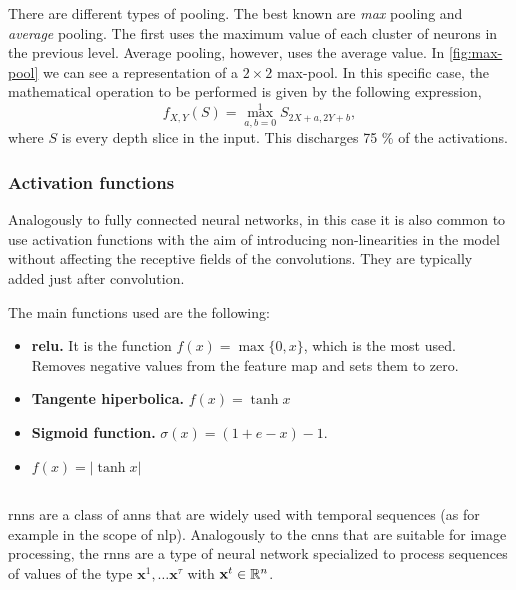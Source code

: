 There are different types of pooling. The best known are \emph{max} pooling and
\emph{average} pooling. The first uses the maximum value of each cluster of
neurons in the previous level. Average pooling, however, uses the average
value. In \vref{fig:max-pool} we can see a representation of a \(2 \times 2\)
max-pool. In this specific case, the mathematical operation to be performed is
given by the following expression,
\begin{equation}
  f_{X,Y}(S) = \max _{a,b=0}^{1}S_{2X+a,2Y+b},
\end{equation}
where \(S\) is every depth slice in the input. This discharges 75 \% of the
activations.

\subsubsection{Activation functions}

Analogously to fully connected neural networks, in this case it is also common
to use activation functions with the aim of introducing non-linearities in the
model without affecting the receptive fields of the convolutions. They are
typically added just after convolution.

The main functions used are the following:
\begin{itemize}
  \item \textbf{\gls*{relu}.} It is the function \(f (x) = \max \{0, x\}\),
  which is the most used. Removes negative values from the feature map and sets
  them to zero.
  \item \textbf{Tangente hiperbolica.} \(f (x) = \tanh x\)
  \item \textbf{Sigmoid function.} \(\sigma (x) ={(1 + e - x)} -1\).
  \item \(f (x) = | \tanh x |\)
\end{itemize}


\subsection{}\label{sec:rnn}

\glspl{rnn} are a class of \glspl{ann} that are widely used with temporal
sequences (as for example in the scope of \gls{nlp}). Analogously to the
\glspl{cnn} that are suitable for image processing, the \glspl{rnn} are a type
of neural network specialized to process sequences of values of the type
\(\mathbf{x}^1, \ldots \mathbf{x}^{\tau}\) with \(\mathbf{x}^t \in \mathbb{R}^n\).

